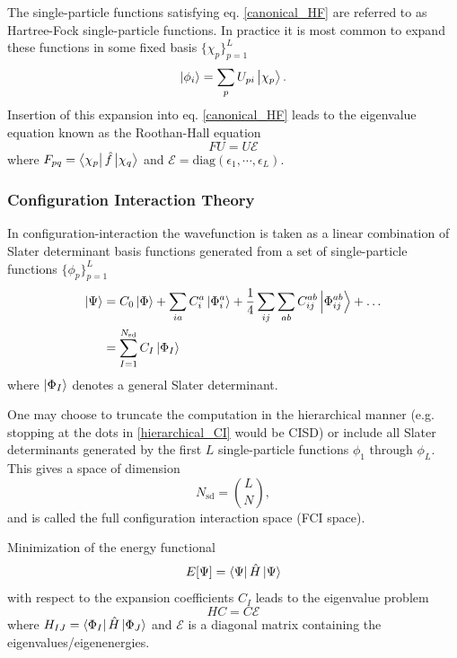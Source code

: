 \documentclass[aip,jcp,reprint,floatfix]{revtex4-1}
\begin{document}
    The single-particle functions satisfying eq. \ref{canonical_HF} are referred to as Hartree-Fock single-particle functions. In practice it is most common to expand these functions in some fixed basis $\{\chi_p\}_{p=1}^L$  
    \begin{equation}
        \ket{\phi_i} = \sum_p U_{p i} \ket{\chi_p}.
    \end{equation}
    Insertion of this expansion into eq. \ref{canonical_HF} leads to the eigenvalue equation known as the Roothan-Hall equation 
    \begin{equation}
        FU = U\mathcal{E} 
    \end{equation}
    where $F_{pq} = \bra{\chi_p}\hat{f}\ket{\chi_q}$ and $\mathcal{E} = \text{diag}(\epsilon_1,\cdots,\epsilon_L)$.
    
    \subsubsection{Configuration Interaction Theory}
    
    In configuration-interaction the wavefunction is taken as a linear combination of Slater determinant basis functions generated from a set of single-particle functions $\{\phi_p \}_{p=1}^L$
    \begin{align}
        \label{hierarchical_CI}
        \ket{\Psi} &= C_0\ket{\Phi} + \sum_{ia}C^a_i\ket{\Phi^a_i} 
        + \frac{1}{4}\sum_{ij} \sum_{ab} C^{ab}_{ij}\ket{\Phi^{ab}_{ij}} + \dots \nonumber \\
        &= \sum_{I=1}^{N_\text{sd}} C_I \ket{\Phi_I}
    \end{align}
    where $\ket{\Phi_I}$ denotes a general Slater determinant.
    
    One may choose to truncate the computation in the hierarchical manner (e.g. stopping at the dots in \autoref{hierarchical_CI} would be CISD) or include all Slater determinants generated by the first $L$ single-particle functions $\phi_1$ through $\phi_{L}$. This gives a space of dimension 
    \begin{equation}
    N_\text{sd} = \binom{L}{N},    
    \end{equation} and is called the full configuration interaction space (FCI space). 
    
    Minimization of the energy functional 
    \begin{equation}
        E[\Psi] = \bra{\Psi} \hat{H} \ket{\Psi}
    \end{equation}
    with respect to the expansion coefficients $C_I$ leads to the eigenvalue problem\cite{szabo1996modern}    
    \begin{equation}
        HC = C\mathcal{E}
    \end{equation}
    where $H_{IJ} = \bra{\Phi_I}\hat{H}\ket{\Phi_J}$ and $\mathcal{E}$ is a diagonal matrix containing the eigenvalues/eigenenergies.
    
\end{document}

